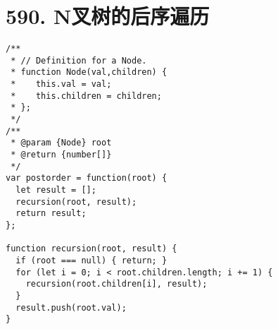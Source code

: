 \newpage
\section{590. N叉树的后序遍历}
\label{leetcode:590}

\begin{verbatim}
/**
 * // Definition for a Node.
 * function Node(val,children) {
 *    this.val = val;
 *    this.children = children;
 * };
 */
/**
 * @param {Node} root
 * @return {number[]}
 */
var postorder = function(root) {
  let result = [];
  recursion(root, result);
  return result;
};

function recursion(root, result) {
  if (root === null) { return; }
  for (let i = 0; i < root.children.length; i += 1) {
    recursion(root.children[i], result);
  }
  result.push(root.val);
}
\end{verbatim}